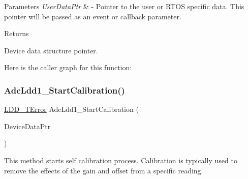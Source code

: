 \begin{DoxyParams}{Parameters}
{\em User\+Data\+Ptr} & -\/ Pointer to the user or R\+T\+OS specific data. This pointer will be passed as an event or callback parameter. \\
\hline
\end{DoxyParams}
\begin{DoxyReturn}{Returns}

\begin{DoxyItemize}
\item Device data structure pointer. 
\end{DoxyItemize}
\end{DoxyReturn}
Here is the caller graph for this function\+:
\mbox{\label{group___adc_ldd1__module_gab9d49b5f1a7ef34cde56046754ebb62a}} 
\subsubsection{\texorpdfstring{Adc\+Ldd1\+\_\+\+Start\+Calibration()}{AdcLdd1\_StartCalibration()}}
{\footnotesize\ttfamily \hyperlink{group___p_e___types__module_ga24c2b045fd04e79e85f261ce4df35588}{L\+D\+D\+\_\+\+T\+Error} Adc\+Ldd1\+\_\+\+Start\+Calibration (\begin{DoxyParamCaption}\item[{\hyperlink{group___p_e___types__module_gac5cf1362f1f0e3a2ce71b1bf2276d091}{L\+D\+D\+\_\+\+T\+Device\+Data} $\ast$}]{Device\+Data\+Ptr }\end{DoxyParamCaption})}



This method starts self calibration process. Calibration is typically used to remove the effects of the gain and offset from a specific reading. 


